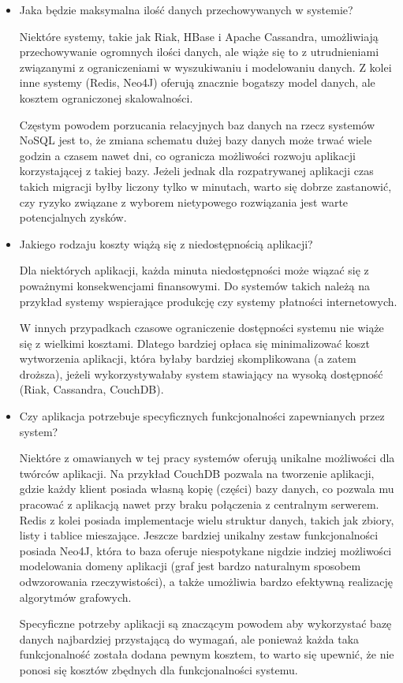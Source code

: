 \begin{itemize}
 
 \item Jaka będzie maksymalna ilość danych przechowywanych w systemie?

 Niektóre systemy, takie jak Riak, HBase i Apache Cassandra, umożliwiają przechowywanie ogromnych ilości danych, ale wiąże się to z utrudnieniami związanymi z ograniczeniami w wyszukiwaniu i modelowaniu danych.
 Z kolei inne systemy (Redis, Neo4J) oferują znacznie bogatszy model danych, ale kosztem ograniczonej skalowalności.

 Częstym powodem porzucania relacyjnych baz danych na rzecz systemów NoSQL jest to, że zmiana schematu dużej bazy danych może trwać wiele godzin a czasem nawet dni, co ogranicza możliwości rozwoju aplikacji korzystającej z takiej bazy.
 Jeżeli jednak dla rozpatrywanej aplikacji czas takich migracji byłby liczony tylko w minutach, warto się dobrze zastanowić, czy ryzyko związane z wyborem nietypowego rozwiązania jest warte potencjalnych zysków.

 \item Jakiego rodzaju koszty wiążą się z niedostępnością aplikacji?

 Dla niektórych aplikacji, każda minuta niedostępności może wiązać się z poważnymi konsekwencjami finansowymi.
 Do systemów takich należą na przykład systemy wspierające produkcję czy systemy płatności internetowych.

 W innych przypadkach czasowe ograniczenie dostępności systemu nie wiąże się z wielkimi kosztami. 
 Dlatego bardziej opłaca się minimalizować koszt wytworzenia aplikacji, która byłaby bardziej skomplikowana (a zatem droższa), jeżeli wykorzystywałaby system stawiający na wysoką dostępność (Riak, Cassandra, CouchDB).

 \item Czy aplikacja potrzebuje specyficznych funkcjonalności zapewnianych przez system?

 Niektóre z omawianych w tej pracy systemów oferują unikalne możliwości dla twórców aplikacji.
 Na przykład CouchDB pozwala na tworzenie aplikacji, gdzie każdy klient posiada własną kopię (części) bazy danych, co pozwala mu pracować z aplikacją nawet przy braku połączenia z centralnym serwerem.
 Redis z kolei posiada implementacje wielu struktur danych, takich jak zbiory, listy i tablice mieszające.
 Jeszcze bardziej unikalny zestaw funkcjonalności posiada Neo4J, która to baza oferuje niespotykane nigdzie indziej możliwości modelowania domeny aplikacji (graf jest bardzo naturalnym sposobem odwzorowania rzeczywistości), a także umożliwia bardzo efektywną realizację algorytmów grafowych.

 Specyficzne potrzeby aplikacji są znaczącym powodem aby wykorzystać bazę danych najbardziej przystającą do wymagań, ale ponieważ każda taka funkcjonalność została dodana pewnym kosztem, to warto się upewnić, że nie ponosi się kosztów zbędnych dla funkcjonalności systemu.

\end{itemize}

